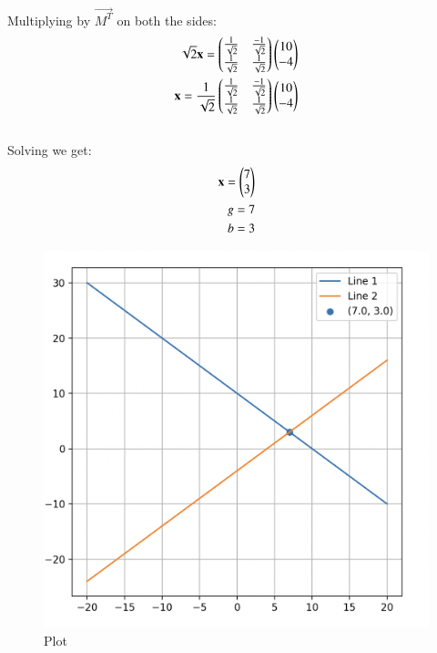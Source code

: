 \documentclass[12pt]{article}
\begin{document}
Multiplying by $\vec{M^T}$ on both the sides:
\begin{align}
\sqrt{2}\mathbf{x} = \begin{pmatrix}\frac{1}{\sqrt{2}} & \frac{-1}{\sqrt{2}} \\  \frac{1}{\sqrt{2}}& \frac{1}{\sqrt{2}}\end{pmatrix} \begin{pmatrix}10\\-4\end{pmatrix}\\
\mathbf{x} = \frac{1}{\sqrt{2}}\begin{pmatrix}\frac{1}{\sqrt{2}} & \frac{-1}{\sqrt{2}} \\  \frac{1}{\sqrt{2}}& \frac{1}{\sqrt{2}}\end{pmatrix} \begin{pmatrix}10\\-4\end{pmatrix}
\end{align}\\
Solving we get:\begin{align}
\mathbf{x} = \begin{pmatrix}7\\3\end{pmatrix} \\
g = 7\\
b=3
\end{align}

\begin{figure}[H]
    \centering
    \includegraphics[width=0.6\columnwidth]{Figs/582.png}
    \caption{Plot}
    \label{fig:placeholder}
\end{figure}
\end{document}
